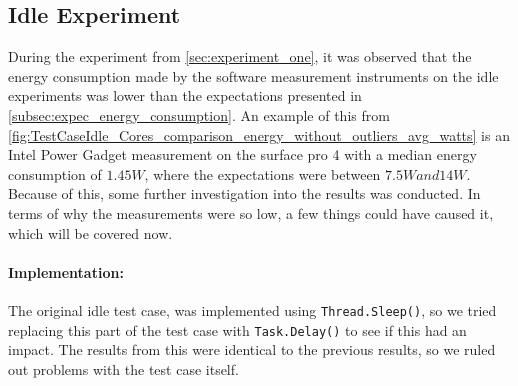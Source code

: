 \subsection{Idle Experiment}

During the experiment from \cref{sec:experiment_one}, it was observed that the energy consumption made by the software measurement instruments on the idle experiments was lower than the expectations presented in \cref{subsec:expec_energy_consumption}. An example of this from \cref*{fig:TestCaseIdle_Cores_comparison_energy_without_outliers_avg_watts} is an Intel Power Gadget measurement on the surface pro 4 with a median energy consumption of $1.45W$, where the expectations were between $7.5W and 14W$. Because of this, some further investigation into the results was conducted. In terms of why the measurements were so low, a few things could have caused it, which will be covered now.



\paragraph{Implementation:} The original idle test case, was implemented using \texttt{Thread.Sleep()}, so we tried replacing this part of the test case with \texttt{Task.Delay()} to see if this had an impact. The results from this were identical to the previous results, so we ruled out problems with the test case itself.


